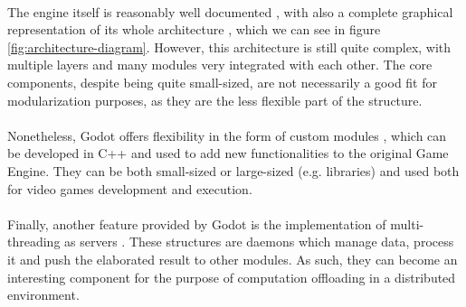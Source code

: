 \\ The engine itself is reasonably well documented \cite{site:godot-doc}, with also a complete graphical representation of its whole architecture \cite{site:godot-architecture}, which we can see in figure \ref{fig:architecture-diagram}. However, this architecture is still quite complex, with multiple layers and many modules very integrated with each other. The core components, despite being quite small-sized, are not necessarily a good fit for modularization purposes, as they are the less flexible part of the structure. \\ \\
Nonetheless, Godot offers flexibility in the form of custom modules \cite{site:godot-modules}, which can be developed in C++ and used to add new functionalities to the original Game Engine. They can be both small-sized or large-sized (e.g. libraries) and used both for video games development and execution. \\ \\
Finally, another feature provided by Godot is the implementation of multi-threading as servers \cite{site:godot-servers}. These structures are daemons which manage data, process it and push the elaborated result to other modules. As such, they can become an interesting component for the purpose of computation offloading in a distributed environment.

